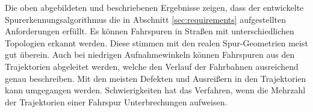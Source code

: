 Die oben abgebildeten und beschriebenen Ergebnisse zeigen, dass der entwickelte Spurerkennungsalgorithmus die in
Abschnitt \ref{sec:requirements} aufgestellten Anforderungen erfüllt.
Es können Fahrspuren in Straßen mit unterschiedlichen Topologien erkannt werden. Diese stimmen
mit den realen Spur-Geometrien meist gut überein. Auch bei niedrigen Aufnahmewinkeln können
Fahrspuren aus den Trajektorien abgeleitet werden, welche den Verlauf der Fahrbahnen ausreichend genau
beschreiben. Mit den meisten Defekten und Ausreißern in den Trajektorien kann umgegangen werden.
Schwierigkeiten hat das Verfahren, wenn die Mehrzahl der Trajektorien einer Fahrspur
Unterbrechungen aufweisen.